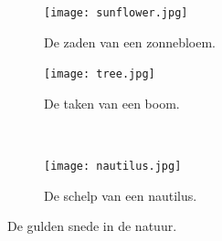 \documentclass{article}
\begin{document}
\begin{figure}[Hh]
    \centering
    \begin{subfigure}[b]{0.48\textwidth}
        \texttt{[image: sunflower.jpg]}
		\caption{De zaden van een zonnebloem.}
		\label{fig:sunflower}
        
        \texttt{[image: tree.jpg]}
		\caption{De taken van een boom.}
   		\label{fig:tree}
    \end{subfigure}
	~ %
    \begin{subfigure}[b]{0.48\textwidth}
        \texttt{[image: nautilus.jpg]}
		\caption{De schelp van een nautilus.}
		\label{fig:nautilus}
    \end{subfigure}
    
    \caption{De gulden snede in de natuur.}
    \label{fig:nature-phi}
\end{figure}
\end{document}
